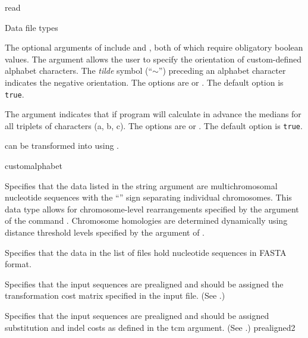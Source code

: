 \begin{command}{read}{}
\begin{arguments}
\begin{argumentgroup}{Data file types}
{	The optional arguments of  include 
	and , both of which require obligatory boolean values. The argument
	 allows the user to specify the orientation of custom-defined alphabet
	characters. The \emph{tilde} symbol (``$\sim$'') preceding an alphabet character indicates
	the negative orientation. The options are 
	or . The default option is \texttt{true}.
	
	The argument  indicates that if program will calculate in advance
	the medians for all triplets of characters (a, b, c). The options are  or
	. The default option is \texttt{true}.
	
	can be transformed into  using .}
	 {customalphabet}
        
            {Specifies that the data listed in the string argument are
            multichromosomal nucleotide sequences with the ``\atsymbol'' sign 
            separating individual chromosomes. This data type
            allows for chromosome-level rearrangements specified by
            the argument
             of the command
            . Chromosome
            homologies are determined dynamically using distance
            threshold levels specified by the argument
            of .} 
            {}
            
            {Specifies that the data in the list of files hold nucleotide
            sequences in FASTA format.} 
            {}

            {Specifies that the input sequences are prealigned and
            should be assigned the transformation cost matrix specified in the
            input file. (See .)}
            {}

            {Specifies that the input sequences are prealigned and should be
            assigned substitution and indel costs as defined in the tcm
            argument. (See .)}
            {prealigned2}


\end{argumentgroup}
\end{arguments}
\end{command}
